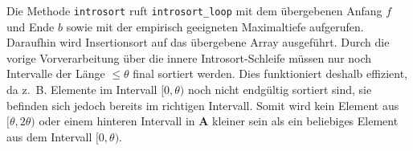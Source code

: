 Die Methode \texttt{introsort} ruft \texttt{introsort\_loop} mit dem übergebenen Anfang $f$ und Ende $b$ sowie
mit der empirisch geeigneten Maximaltiefe aufgerufen. Daraufhin wird Insertionsort auf das übergebene Array ausgeführt.
Durch die vorige Vorverarbeitung über die innere Introsort-Schleife müssen nur noch Intervalle
der Länge $\leq \theta$ final sortiert werden.
Dies funktioniert deshalb effizient, da z.~B. Elemente im Intervall $[0, \theta)$ noch nicht
endgültig sortiert sind, sie befinden sich jedoch bereits im richtigen Intervall.
Somit wird kein Element aus $[\theta, 2 \theta)$ oder einem hinteren Intervall in \textbf{A} kleiner
sein als ein beliebiges Element aus dem Intervall $[0,\theta)$.
